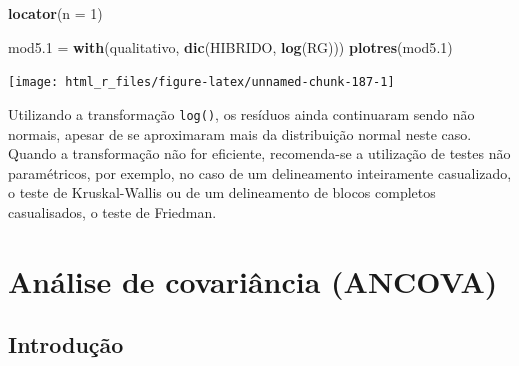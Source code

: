 \documentclass[
]{book}
\newenvironment{Shaded}{\begin{snugshade}}{\end{snugshade}}
\newcommand{\DataTypeTok}[1]{\textcolor[rgb]{0.13,0.29,0.53}{#1}}
\newcommand{\DecValTok}[1]{\textcolor[rgb]{0.00,0.00,0.81}{#1}}
\newcommand{\FloatTok}[1]{\textcolor[rgb]{0.00,0.00,0.81}{#1}}
\newcommand{\KeywordTok}[1]{\textcolor[rgb]{0.13,0.29,0.53}{\textbf{#1}}}
\newcommand{\NormalTok}[1]{#1}
\newcommand{\StringTok}[1]{\textcolor[rgb]{0.31,0.60,0.02}{#1}}
\numberwithin{equation}{section}
\begin{document}
\begin{Shaded}
\begin{Highlighting}[]
\KeywordTok{locator}\NormalTok{(}\DataTypeTok{n =} \DecValTok{1}\NormalTok{)}
\end{Highlighting}
\end{Shaded}

\begin{Shaded}
\begin{Highlighting}[]

\NormalTok{mod5}\FloatTok{.1}\NormalTok{  =}\StringTok{ }\KeywordTok{with}\NormalTok{(qualitativo, }\KeywordTok{dic}\NormalTok{(HIBRIDO, }\KeywordTok{log}\NormalTok{(RG)))}
\KeywordTok{plotres}\NormalTok{(mod5}\FloatTok{.1}\NormalTok{)}
\end{Highlighting}
\end{Shaded}

\begin{center}\texttt{[image: html\_r\_files/figure-latex/unnamed-chunk-187-1]} \end{center}

Utilizando a transformação \texttt{log()}, os resíduos ainda continuaram sendo não normais, apesar de se aproximaram mais da distribuição normal neste caso. Quando a transformação não for eficiente, recomenda-se a utilização de testes não paramétricos, por exemplo, no caso de um delineamento inteiramente casualizado, o teste de Kruskal-Wallis ou de um delineamento de blocos completos casualisados, o teste de Friedman.

\hypertarget{ancova}{%
\section{Análise de covariância (ANCOVA)}\label{ancova}}

\hypertarget{introduuxe7uxe3o}{%
\subsection{Introdução}\label{introduuxe7uxe3o}}
\end{document}
